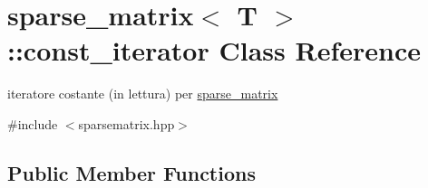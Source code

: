 \hypertarget{classsparse__matrix_1_1const__iterator}{}\section{sparse\+\_\+matrix$<$ T $>$\+:\+:const\+\_\+iterator Class Reference}
\label{classsparse__matrix_1_1const__iterator}


iteratore costante (in lettura) per \hyperlink{classsparse__matrix}{sparse\+\_\+matrix}  




{\ttfamily \#include $<$sparsematrix.\+hpp$>$}

\subsection*{Public Member Functions}
